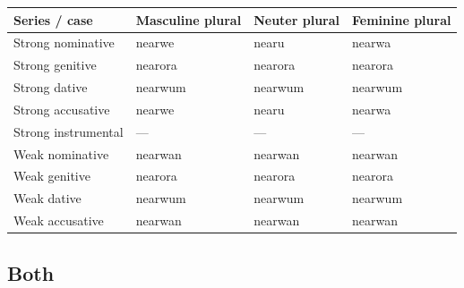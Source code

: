 \noindent
\begin{tabular}{@{}>{\raggedright\arraybackslash}p{36.136mm}>{\raggedright\arraybackslash}p{28.98mm}>{\raggedright\arraybackslash}p{23.852mm}>{\raggedright\arraybackslash}p{26.595mm}@{}}
\toprule
\textbf{Series /\allowbreak{} case} & \textbf{Masculine plural} & \textbf{Neuter plural} & \textbf{Feminine plural} \\
\midrule
Strong nominative & nearwe & nearu & nearwa \\
Strong genitive & nearora & nearora & nearora \\
Strong dative & nearwum & nearwum & nearwum \\
Strong accusative & nearwe & nearu & nearwa \\
Strong instrumental & — & — & — \\
Weak nominative & nearwan & nearwan & nearwan \\
Weak genitive & nearora & nearora & nearora \\
Weak dative & nearwum & nearwum & nearwum \\
Weak accusative & nearwan & nearwan & nearwan \\
\bottomrule
\end{tabular}
\par\endgroup

\subsection*{Both}

